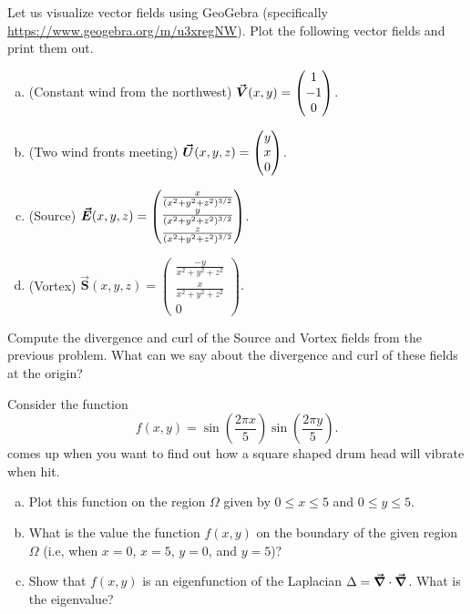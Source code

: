 \documentclass[12pt]{article} %
\begin{document}
\begin{problem} 
Let us visualize vector fields using GeoGebra (specifically \url{https://www.geogebra.org/m/u3xregNW}). Plot the following vector fields and print them out. 
\begin{enumerate}[(a)]
    \item (Constant wind from the northwest) $\boldsymbol{\vec{V}}(x,y)=\begin{pmatrix} 1 \\ -1 \\ 0\end{pmatrix}$.
        \item (Two wind fronts meeting) $\boldsymbol{\vec{U}}(x,y,z)=\begin{pmatrix} y \\ x \\ 0 \end{pmatrix}$.
                        \item (Source) $\boldsymbol{\vec{E}}(x,y,z) = \begin{pmatrix} \frac{x}{(x^2+y^2+z^2)^{3/2}} \\ \frac{y}{(x^2+y^2+z^2)^{3/2}} \\ \frac{z}{(x^2+y^2+z^2)^{3/2}} \end{pmatrix}$.
                  \item (Vortex) $\boldsymbol{\vec{S}}(x,y,z)=\begin{pmatrix} \frac{-y}{x^2+y^2+z^2} \\ \frac{x}{x^2+y^2+z^2} \\ 0\end{pmatrix}.$           
\end{enumerate}
\end{problem}

\begin{problem}
Compute the divergence and curl of the Source and Vortex fields from the previous problem.  What can we say about the divergence and curl of these fields at the origin?
\end{problem}

\begin{problem}
Consider the function
\[
f(x,y)=\sin\left(\frac{2\pi x}{5}\right)\sin\left(\frac{2\pi y}{5}\right).
\]
comes up when you want to find out how a square shaped drum head will vibrate when hit. 
\begin{enumerate}[(a)]
    \item Plot this function on the region $\Omega$ given by $0\leq x \leq 5$ and $0\leq y \leq 5$.  
    \item What is the value the function $f(x,y)$ on the boundary of the given region $\Omega$ (i.e, when $x=0$, $x=5$, $y=0$, and $y=5$)?
    \item Show that $f(x,y)$ is an eigenfunction of the Laplacian $\Delta = \boldsymbol{\vec{\nabla}} \cdot \boldsymbol{\vec{\nabla}}$. What is the eigenvalue?
\end{enumerate}
\end{problem}
\end{document}
